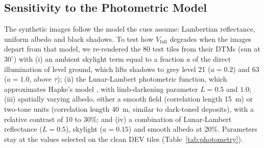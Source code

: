 \documentclass{article}
\begin{document}
\subsection{Sensitivity to the Photometric Model}
\label{sec:photometry}
The synthetic images follow the model the cues assume: Lambertian reflectance, uniform albedo and black shadows. To test how $V_{\text{full}}$ degrades when the images depart from that model, we re-rendered the 80 test tiles from their DTMs (sun at $30^\circ$) with (i) an ambient skylight term equal to a fraction $a$ of the direct illumination of level ground, which lifts shadows to grey level 21 ($a = 0.2$) and 63 ($a = 1.0$, above $\tau$); (ii) the Lunar-Lambert photometric function, which approximates Hapke's model \cite{mcewen1991photometric}, with limb-darkening parameter $L = 0.5$ and $1.0$; (iii) spatially varying albedo, either a smooth field (correlation length 15~m) or two-tone units (correlation length 40~m, similar to dark-toned deposits), with a relative contrast of 10 to 30\%; and (iv) a combination of Lunar-Lambert reflectance ($L = 0.5$), skylight ($a = 0.15$) and smooth albedo at 20\%. Parameters stay at the values selected on the clean DEV tiles (Table~\ref{tab:photometry}).
\end{document}
